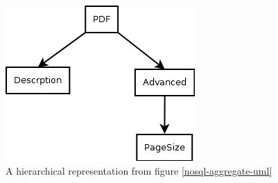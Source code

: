 \begin{figure}[ht]
	\centering
	\includegraphics[scale=0.5]{res/bg-knowledge/nosql-uml-hiarch-repr}
	\caption{A hierarchical representation from figure \ref{nosql-aggregate-uml}}
	\label{nosql-uml-hiarch-repr}	
\end{figure}


